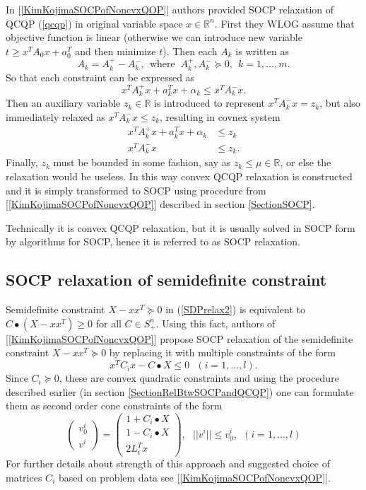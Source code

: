 \documentclass[10pt,oneside]{book}
\theoremstyle{definition}
\begin{document}
In [\ref{KimKojimaSOCPofNoncvxQOP}] authors provided SOCP relaxation of QCQP (\ref{qcqp}) in original variable space $x\in \mathbb{R}^n$. First they WLOG assume that objective function is linear (otherwise we can introduce new variable $t\geq x^TA_0x + a_0^T$ and then minimize $t$). Then each $A_k$ is written as 
$$A_k=A_k^+ -A_k^-, \ \ \mbox{where } \ A_k^+, A_k^- \succeq 0, \ \ k=1,\dots ,m.$$ 
So that each constraint can be expressed as 
$$x^TA_k^+x + a_k^Tx + \alpha_k \leq x^TA_k^-x.$$
Then an auxiliary variable $z_k\in \mathbb{R}$ is introduced to represent $x^TA_k^-x = z_k$, but also immediately relaxed as $x^TA_k^-x \leq z_k$, resulting in covnex system
\begin{equation}
\begin{array}{rl}
x^TA_k^+x + a_k^Tx + \alpha_k &\leq z_k  \\
x^TA_k^-x & \leq z_k.
\end{array} 
\end{equation}
Finally, $z_k$ must be bounded in some fashion, say as $z_k\leq \mu \in \mathbb{R}$, or else the relaxation would be useless. In this way convex QCQP relaxation is constructed and it is simply transformed to SOCP using procedure from [\ref{KimKojimaSOCPofNoncvxQOP}] described in section \ref{SectionSOCP}.

\rem Technically it is convex QCQP relaxation, but it is usually solved in SOCP form by algorithms for SOCP, hence it is referred to as SOCP relaxation. 

\subsection{SOCP relaxation of semidefinite constraint}

Semidefinite constraint $X-xx^T\succeq 0$  in (\ref{SDPrelax2}) is equivalent to $C\bullet(X-xx^T)\geq 0$ for all $C\in S^n_+$. Using this fact, authors of  [\ref{KimKojimaSOCPofNoncvxQOP}] propose SOCP relaxation of the semidefinite constraint $X-xx^T\succeq 0$ by replacing it with multiple constraints of the form 
$$x^TC_ix-C\bullet X \leq 0 \ \ \ (i=1,\dots ,l).$$ 
Since $C_i\succeq 0$, these are convex quadratic constraints and using the procedure described earlier (in section \ref{SectionRelBtwSOCPandQCQP}) one can formulate them as second order cone constraints of the form
\begin{equation}
\label{SOCPRelaxOfPSDconstraint}
\left(\begin{array}{c}
v^i_0\\
v^i
\end{array}\right)
= \left(\begin{array}{c}
1+C_i\bullet X\\
1-C_i\bullet X \\
2L_i^Tx
\end{array}\right), \ \ \ ||v^i||\leq v^i_0, \ \ (i  = 1,\dots ,l)
\end{equation}
For further details about strength of this approach and suggested choice of matrices $C_i$ based on problem data see [\ref{KimKojimaSOCPofNoncvxQOP}].
\end{document}
